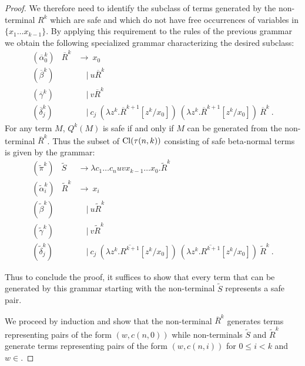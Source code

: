 \begin{proof}
We therefore need to identify the subclass of terms generated by the non-terminal $R^k$ which are safe and which do not have free occurrences of variables in $\{x_1 \ldots x_{k-1}\}$. By applying this requirement to the rules of the previous grammar we obtain the following specialized grammar characterizing the desired subclass:
\begin{eqnarray*}
  (\overline\alpha_0^k) &\overline R^k &\rightarrow\ x_0 \\
  (\overline\beta^k) && \quad|\  u \overline R^k \\
  (\overline\gamma^k) && \quad|\  v \overline R^k  \\
  (\overline\delta^k_j) && \quad|\  c_j\ (\lambda z^k. \overline R^{k+1}[z^k/x_0]) \ (\lambda z^k. \overline R^{k+1} [z^k/x_0]) \ \overline R^k \ .
\end{eqnarray*}
For any term $M$, $Q^k(M)$ is safe if and only if $M$ can be
generated from the non-terminal $\overline R^k$. Thus the subset of
${\rm Cl}(\tau(n,k))$ consisting of safe beta-normal terms is given
by the grammar:
\begin{eqnarray*}
  (\widetilde\pi^k) &\widetilde S &\rightarrow \lambda c_1 \ldots c_n u v x_{k-1} \ldots x_0 . \widetilde R^k \\
  (\widetilde\alpha_i^k) &\widetilde R^k &\rightarrow\ x_i \\
  (\widetilde\beta^k) && \quad|\  u \widetilde R^k \\
  (\widetilde\gamma^k) && \quad|\  v \widetilde R^k \\
  (\widetilde\delta^k_j) && \quad|\  c_j\ (\lambda z^k. \overline{R^{k+1}}[z^k/x_0]) \ (\lambda z^k. \overline{R^{k+1}}[z^k/x_0]) \ \widetilde R^k \ .
\end{eqnarray*}

Thus to conclude the proof, it suffices to show that every term that
can be generated by this grammar starting with the non-terminal
$\widetilde S$ represents a safe pair.

We proceed by induction and show that the non-terminal $\overline
R^k$ generates terms representing pairs of the form $(w,c(n,0))$
while non-terminals $\widetilde S$ and $\widetilde R^k$ generate
terms representing pairs of the form $(w,c(n,i))$ for $0 \leq i<k$
and $w \in$\safedefset.


\end{proof}
